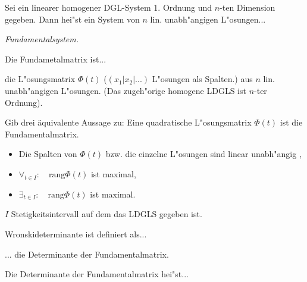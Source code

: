 \documentclass[9pt]{article}
\newenvironment{field}{}{\newpage}
\newif\ifnote
\newenvironment{note}{\notetrue}{\notefalse}
\newcommand{\localtag}{}
\newcommand{\globaltag}{}
\newcommand{\uuid}{}
\newcommand{\tags}[1]{
    \ifnote 
        \renewcommand{\localtag}{#1}
    \else
        \renewcommand{\globaltag}{#1}
    \fi 
    }
\newcommand{\xplain}[1]{\renewcommand{\uuid}{#1}}
\begin{document}
\begin{note}
	\xplain{UUID}
	\tags{LDGLS}
	
	\begin{field}  %
		Sei ein linearer homogener DGL-System 1. Ordnung und $n$-ten Dimension gegeben. Dann hei"st ein System von 
		$n$ lin. unabh"angigen L"osungen...
	\end{field}
	
	\begin{field}  %
		\textit{Fundamentalsystem.}
	\end{field}
		
	\begin{field}  %
		Die Fundametalmatrix ist...
	\end{field}
	
	\begin{field}  %
		die L"osungsmatrix $\Phi(t)$ ($(x_1|x_2|...)$ L"osungen als Spalten.) aus $n$ lin. unabh"angigen L"osungen. (Das zugeh"orige homogene LDGLS ist $n$-ter Ordnung).
	\end{field}
		
	\begin{field}  %
		Gib drei äquivalente Aussage zu: Eine quadratische L"osungsmatrix $\Phi(t)$ ist die Fundamentalmatrix.
	\end{field}
	
	\begin{field}  %
		\begin{itemize}
			\item Die Spalten von $\Phi(t)$ bzw. die einzelne L"osungen sind linear unabh"angig ,
			\item $\forall_{t\in I}: \quad \text{rang}\Phi(t)$ ist maximal,
			\item $\exists_{t\in I}: \quad \text{rang}\Phi(t)$ ist maximal.
		\end{itemize}
	$I$ Stetigkeitsintervall auf dem das LDGLS gegeben ist.  
	\end{field}
		
	\begin{field}  %
		Wronskideterminante ist definiert als...
	\end{field}
	
	\begin{field}  %
		... die Determinante der Fundamentalmatrix.
	\end{field}
		
	\begin{field}  %
		Die Determinante der Fundamentalmatrix hei"st...
	\end{field}
	

\end{note}
\end{document}
